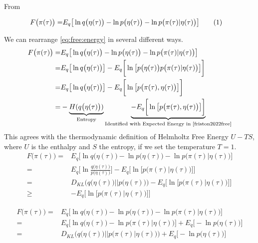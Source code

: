 \documentclass[]{article}
\newcommand\numberthis{\addtocounter{equation}{1}\tag{\theequation}}
\begin{document}
From \cite{friston2022free}

\begin{align*}
	F\big(\pi(\tau)\big) =& E_q\big[\ln q\big(\eta(\tau)\big) - \ln p\big(\eta(\tau)\big) - \ln p\big(\pi(\tau)\vert\eta(\tau)\big)\big] \numberthis \label{eq:free:energy}
\end{align*}

We can rearrange \eqref{eq:free:energy} in several different ways.
\begin{align*}
	F\big(\pi(\tau)\big) =& E_q\big[\ln q\big(\eta(\tau)\big) - \ln p\big(\eta(\tau)\big) - \ln p\big(\pi(\tau)\vert\eta(\tau)\big)\big]\\
	=& E_q\big[\ln q\big(\eta(\tau)\big)\big] - E_q \bigg[\ln \big[p\big(\eta(\tau)\big)  p\big(\pi(\tau)\vert\eta(\tau)\big)\big]\bigg]\\
	=& E_q\big[\ln q\big(\eta(\tau)\big)\big] - E_q \bigg[\ln \big[  p\big(\pi(\tau),\eta(\tau)\big)\big]\bigg]\\
	=&-\underbrace{H(q\big(\eta(\tau)\big))}_\text{Entropy}  \underbrace{- E_q \bigg[\ln \big[  p\big(\pi(\tau),\eta(\tau)\big)\big]\bigg]}_\text{Identified with Expected Energy in \cite{friston2022free}}
\end{align*}
This agrees with the thermodynamic definition of Helmholtz Free Energy $U-TS$, where $U$ is the enthalpy and $S$ the entropy, if we set the temperature $T=1$.
\begin{align*}
	F\big(\pi(\tau)\big) =& E_q\big[\ln q\big(\eta(\tau)\big) - \ln p\big(\eta(\tau)\big) - \ln p\big(\pi(\tau)\vert\eta(\tau)\big)\big]\\
	=& E_q\big[\ln \frac{q\big(\eta(\tau)\big)}{p\big(\eta(\tau)\big)}   \big] - E_q \bigg[\ln \big[  p\big(\pi(\tau)\vert\eta(\tau)\big)\big]\bigg]\\
	=& D_{KL}\big(q\big(\eta(\tau)\big)\vert\vert p\big(\eta(\tau)\big)\big)- E_q \bigg[\ln \big[  p\big(\pi(\tau)\vert\eta(\tau)\big)\big]\bigg]\\
	\ge&- E_q \bigg[\ln \big[  p\big(\pi(\tau)\vert\eta(\tau)\big)\big]\bigg]
\end{align*}

\begin{align*}
	F\big(\pi(\tau)\big) =& E_q\big[\ln q\big(\eta(\tau)\big) - \ln p\big(\eta(\tau)\big) - \ln p\big(\pi(\tau)\vert\eta(\tau)\big)\big]\\
	=& E_q\big[\ln q\big(\eta(\tau)\big)  - \ln p\big(\pi(\tau)\vert\eta(\tau)\big)\big] +  E_q\big[- \ln p\big(\eta(\tau)\big)\big]\\
	=& D_{KL}\big(q\big(\eta(\tau)\big)\vert\vert p\big(\pi(\tau)\vert\eta(\tau)\big)\big)+  E_q\big[- \ln p\big(\eta(\tau)\big)\big]
\end{align*}
\appendix

\printglossaries




\end{document}
